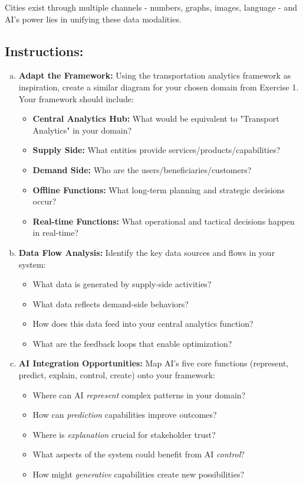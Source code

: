 \documentclass[11pt]{article}
\begin{document}
Cities exist through multiple channels - numbers, graphs, images, language - and AI's power lies in unifying these data modalities.

\subsection{Instructions:}
\begin{enumerate}[(a)]
\item \textbf{Adapt the Framework:} Using the transportation analytics framework as inspiration, create a similar diagram for your chosen domain from Exercise 1. Your framework should include:
\begin{itemize}
\item \textbf{Central Analytics Hub:} What would be equivalent to "Transport Analytics" in your domain?
\item \textbf{Supply Side:} What entities provide services/products/capabilities?
\item \textbf{Demand Side:} Who are the users/beneficiaries/customers?
\item \textbf{Offline Functions:} What long-term planning and strategic decisions occur?
\item \textbf{Real-time Functions:} What operational and tactical decisions happen in real-time?
\end{itemize}

\item \textbf{Data Flow Analysis:} Identify the key data sources and flows in your system:
\begin{itemize}
\item What data is generated by supply-side activities?
\item What data reflects demand-side behaviors?
\item How does this data feed into your central analytics function?
\item What are the feedback loops that enable optimization?
\end{itemize}

\item \textbf{AI Integration Opportunities:} Map AI's five core functions (represent, predict, explain, control, create) onto your framework:
\begin{itemize}
\item Where can AI \textit{represent} complex patterns in your domain?
\item How can \textit{prediction} capabilities improve outcomes?
\item Where is \textit{explanation} crucial for stakeholder trust?
\item What aspects of the system could benefit from AI \textit{control}?
\item How might \textit{generative} capabilities create new possibilities?
\end{itemize}
\end{enumerate}
\end{document}
